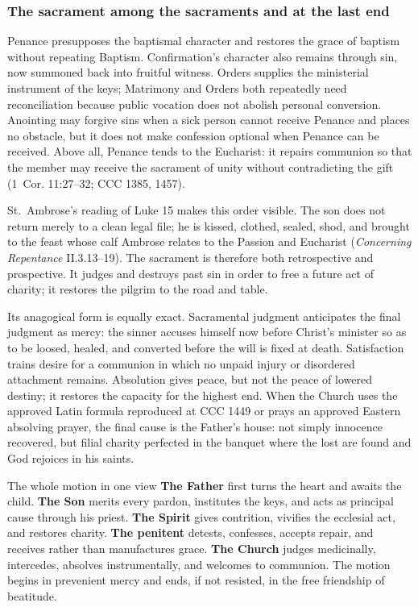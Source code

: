 \subsubsection{The sacrament among the sacraments and at the last end}

Penance presupposes the baptismal character and restores the grace of baptism without repeating Baptism. Confirmation's character also remains through sin, now summoned back into fruitful witness. Orders supplies the ministerial instrument of the keys; Matrimony and Orders both repeatedly need reconciliation because public vocation does not abolish personal conversion. Anointing may forgive sins when a sick person cannot receive Penance and places no obstacle, but it does not make confession optional when Penance can be received. Above all, Penance tends to the Eucharist: it repairs communion so that the member may receive the sacrament of unity without contradicting the gift (1~Cor. 11:27--32; CCC 1385, 1457).

St.~Ambrose's reading of Luke 15 makes this order visible. The son does not return merely to a clean legal file; he is kissed, clothed, sealed, shod, and brought to the feast whose calf Ambrose relates to the Passion and Eucharist (\emph{Concerning Repentance} II.3.13--19). The sacrament is therefore both retrospective and prospective. It judges and destroys past sin in order to free a future act of charity; it restores the pilgrim to the road and table.

Its anagogical form is equally exact. Sacramental judgment anticipates the final judgment as mercy: the sinner accuses himself now before Christ's minister so as to be loosed, healed, and converted before the will is fixed at death. Satisfaction trains desire for a communion in which no unpaid injury or disordered attachment remains. Absolution gives peace, but not the peace of lowered destiny; it restores the capacity for the highest end. When the Church uses the approved Latin formula reproduced at CCC 1449 or prays an approved Eastern absolving prayer, the final cause is the Father's house: not simply innocence recovered, but filial charity perfected in the banquet where the lost are found and God rejoices in his saints.

\begin{massbox}{The whole motion in one view}
\textbf{The Father} first turns the heart and awaits the child. \textbf{The Son} merits every pardon, institutes the keys, and acts as principal cause through his priest. \textbf{The Spirit} gives contrition, vivifies the ecclesial act, and restores charity. \textbf{The penitent} detests, confesses, accepts repair, and receives rather than manufactures grace. \textbf{The Church} judges medicinally, intercedes, absolves instrumentally, and welcomes to communion. The motion begins in prevenient mercy and ends, if not resisted, in the free friendship of beatitude.
\end{massbox}

